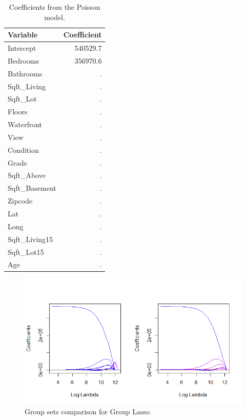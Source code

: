 \documentclass[a4paper, 9pt]{article}
\begin{document}
\begin{table}[ht]
\centering
\begin{tabular}{|l | r|}
\hline
\textbf{Variable} & \textbf{Coefficient} \\
\hline
Intercept     & 540529.7 \\
Bedrooms      & 356970.6 \\
Bathrooms     & . \\
Sqft\_Living   & . \\
Sqft\_Lot      & . \\
Floors        & . \\
Waterfront    & . \\
View          & . \\
Condition     & . \\
Grade         & . \\
Sqft\_Above    & . \\
Sqft\_Basement & . \\
Zipcode       & . \\
Lat           & . \\
Long          & . \\
Sqft\_Living15 & . \\
Sqft\_Lot15    & . \\
Age           & . \\
\hline
\end{tabular}
\caption{Coefficients from the Poisson model.}
\label{glmcoefs}
\end{table}


\begin{figure}[H]
\includegraphics[scale=0.9]{gglassobasic}
\centering
\caption{Group sets comparison for Group Lasso}
\end{figure}
\end{document}
